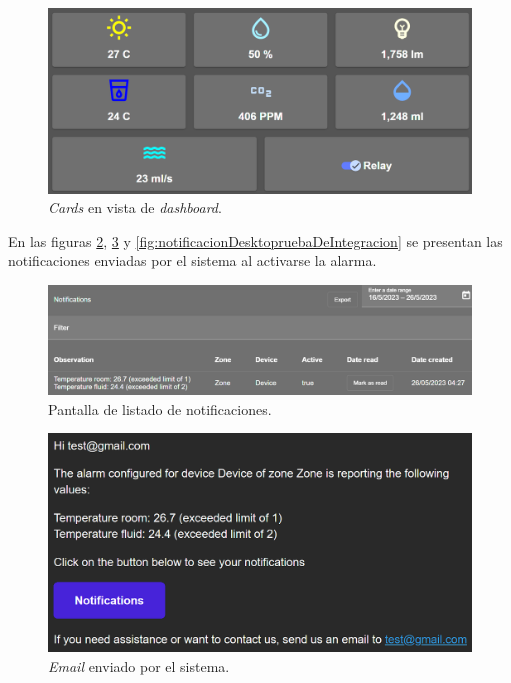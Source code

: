 \begin{figure}[H]
	\centering
	\includegraphics[width=.9\textwidth]{./Figures/Frontend dashboard de zona cards prueba de integracion.png}
	\caption{\textit{Cards} en vista de \textit{dashboard}.}
	\label{fig:frontendDashboardDeZonaPruebaDeIntegracion}
\end{figure}

En las figuras \ref{fig:frontendListadoDeNotificacionesPruebaDeIntegracion}, \ref{fig:notificacionEmailPruebaDeIntegracion} y \ref{fig:notificacionDesktopruebaDeIntegracion} se presentan las notificaciones enviadas por el sistema al activarse la alarma.

\begin{figure}[H]
	\centering
	\includegraphics[width=.9\textwidth]{./Figures/Frontend listado de notificaciones prueba de integracion.png}
	\caption{Pantalla de listado de notificaciones.}
	\label{fig:frontendListadoDeNotificacionesPruebaDeIntegracion}
\end{figure}

\begin{figure}[H]
	\centering
	\includegraphics[width=.8\textwidth]{./Figures/Notificacion email prueba de integracion.png}
	\caption{\textit{Email} enviado por el sistema.}
	\label{fig:notificacionEmailPruebaDeIntegracion}
\end{figure}

